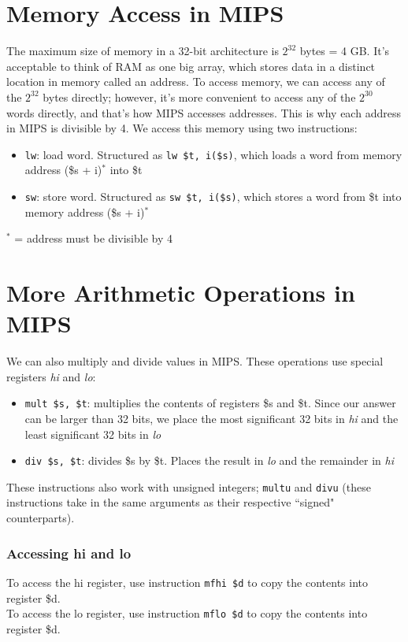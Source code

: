 \documentclass{report}
\begin{document}
\section{Memory Access in MIPS}
The maximum size of memory in a 32-bit architecture is $2^{32}$ bytes = 4 GB. It's acceptable to think of RAM as one big array, which stores data in a distinct location in memory called an address. To access memory, we can access any of the $2^{32}$ bytes directly; however, it's more convenient to access any of the $2^{30}$ words directly, and that's how MIPS accesses addresses. This is why each address in MIPS is divisible by 4. We access this memory using two instructions:
\begin{itemize}
\item \texttt{lw}: load word. Structured as \texttt{lw \$t, i(\$s)}, which loads a word from memory address (\$s + i)$^*$ into \$t
\item \texttt{sw}: store word. Structured as  \texttt{sw \$t, i(\$s)}, which stores a word from \$t into memory address (\$s + i)$^*$
\end{itemize}
$^*$ = address must be divisible by 4
\section{More Arithmetic Operations in MIPS}
We can also multiply and divide values in MIPS. These operations use special registers \textit{hi} and \textit{lo}:
\begin{itemize}
\item \texttt{mult \$s, \$t}: multiplies the contents of registers \$s and \$t. Since our answer can be larger than 32 bits, we place the most significant 32 bits in \textit{hi} and the least significant 32 bits in \textit{lo} 
\item \texttt{div \$s, \$t}: divides \$s by \$t. Places the result in \textit{lo} and the remainder in \textit{hi} 
\end{itemize}
These instructions also work with unsigned integers; \texttt{multu} and \texttt{divu} (these instructions take in the same arguments as their respective ``signed" counterparts).
\subsubsection{Accessing hi and lo}
To access the hi register, use instruction \texttt{mfhi \$d} to copy the contents into register \$d. \\
To access the lo register, use instruction \texttt{mflo \$d} to copy the contents into register \$d.
\end{document}
